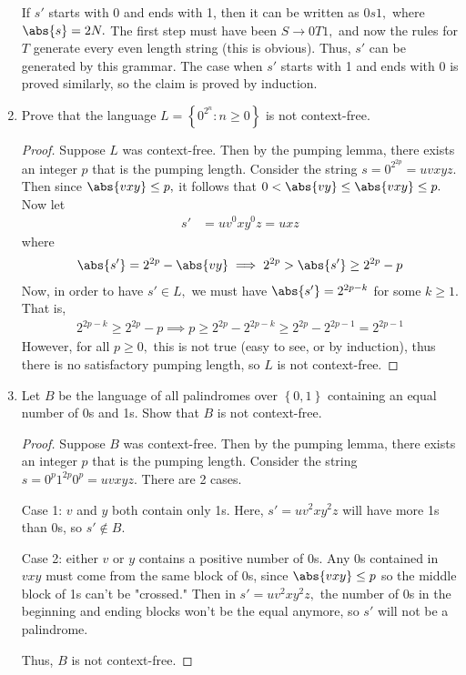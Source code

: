 \documentclass{article}
\begin{document}
\begin{enumerate}
\begin{soln}
			If $s'$ starts with 0 and ends with 1, then it can be written as $0s1,$ where $\abs{s}=2N.$ The first step must have been $S\to 0T1,$ and now the rules for $T$ generate every even length string (this is obvious). Thus, $s'$ can be generated by this grammar. The case when $s'$ starts with 1 and ends with 0 is proved similarly, so the claim is proved by induction.
		\end{soln}

		\newpage
	\item Prove that the language $L=\left\{ 0^{2^n}:n\ge 0 \right\}$ is not context-free.
		\begin{proof}
			Suppose $L$ was context-free. Then by the pumping lemma, there exists an integer $p$ that is the pumping length. Consider the string $s=0^{2^{2p}}=uvxyz.$ Then since $\abs{vxy}\le p,$ it follows that $0<\abs{vy}\le \abs{vxy}\le p.$ Now let
			\begin{align*}
				s' &= uv^0 xy^0 z = uxz
			\end{align*}
			where
			\begin{align*}
				\abs{s'}=2^{2p}-\abs{vy} \implies 2^{2p} >\abs{s'}\ge 2^{2p}-p
			\end{align*}
			Now, in order to have $s'\in L,$ we must have $\abs{s'}=2^{2p-k}$ for some $k\ge 1.$ That is,
			\begin{align*}
				2^{2p-k}\ge 2^{2p}-p\implies p \ge 2^{2p}-2^{2p-k} \ge 2^{2p} - 2^{2p-1} = 2^{2p-1}
			\end{align*}
			However, for all $p\ge 0,$ this is not true (easy to see, or by induction), thus there is no satisfactory pumping length, so $L$ is not context-free.
		\end{proof}

		\newpage
	\item Let $B$ be the language of all palindromes over $\left\{ 0, 1 \right\}$ containing an equal number of 0s and 1s. Show that $B$ is not context-free.
		\begin{proof}
			Suppose $B$ was context-free. Then by the pumping lemma, there exists an integer $p$ that is the pumping length. Consider the string $s=0^p1^{2p}0^p=uvxyz.$ There are 2 cases.

			Case 1: $v$ and $y$ both contain only 1s. Here, $s'=uv^2xy^2z$ will have more 1s than 0s, so $s'\not\in B.$

			Case 2: either $v$ or $y$ contains a positive number of 0s. Any 0s contained in $vxy$ must come from the same block of 0s, since $\abs{vxy}\le p$ so the middle block of 1s can't be "crossed." Then in $s'=uv^2xy^2z,$ the number of 0s in the beginning and ending blocks won't be the equal anymore, so $s'$ will not be a palindrome. 

			Thus, $B$ is not context-free.
		\end{proof}
		
\end{enumerate}
\end{document}
